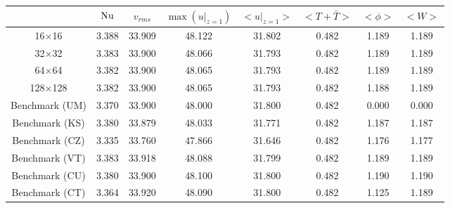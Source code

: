 \begin{tabular}{c|ccccccc}
    & $\mathrm{Nu}$ & $v_{rms}$ & $\max(u|_{z=1})$ & $<u|_{z=1}>$ & $<T + \bar{T}>$ & $<\phi>$ & $<W>$ \\
\hline
16$\times$16 & 3.388 & 33.909 & 48.122 & 31.802 & 0.482 & 1.189 & 1.189 \\
32$\times$32 & 3.383 & 33.900 & 48.066 & 31.793 & 0.482 & 1.189 & 1.189 \\
64$\times$64 & 3.382 & 33.900 & 48.065 & 31.793 & 0.482 & 1.189 & 1.189 \\
128$\times$128 & 3.382 & 33.900 & 48.065 & 31.793 & 0.482 & 1.188 & 1.189 \\
\hline
Benchmark (UM) & 3.370 & 33.900 & 48.000 & 31.800 & 0.482 & 0.000 & 0.000 \\
Benchmark (KS) & 3.380 & 33.879 & 48.033 & 31.771 & 0.482 & 1.187 & 1.187 \\
Benchmark (CZ) & 3.335 & 33.760 & 47.866 & 31.646 & 0.482 & 1.176 & 1.177 \\
Benchmark (VT) & 3.383 & 33.918 & 48.088 & 31.799 & 0.482 & 1.189 & 1.189 \\
Benchmark (CU) & 3.380 & 33.900 & 48.100 & 31.800 & 0.482 & 1.190 & 1.190 \\
Benchmark (CT) & 3.364 & 33.920 & 48.090 & 31.800 & 0.482 & 1.125 & 1.189 \\
\end{tabular}
